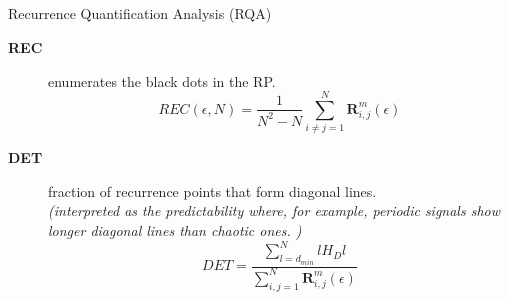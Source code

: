 \subsection{}
{

\begin{frame}{Recurrence Quantification Analysis (RQA)}

\begin{description}
\item [ \textbf{REC} ] enumerates the black dots in the RP.
\begin{equation*}
	REC(\epsilon,N)= 
	\frac{1}{N^2 - N} \sum^{N}_{i \neq j = 1} 
	\mathbf{R}^{m}_{i,j}(\epsilon)
\end{equation*}
\item [ \textbf{DET} ] fraction of recurrence points that form diagonal lines. \\
			\textit{(interpreted as the predictability where, for example,
				periodic signals show longer diagonal lines 
				than chaotic ones.
				)}
\begin{equation*}
	DET=\frac{\sum^{N}_{l=d_{min}} l H_D{l} }{\sum^{N}_{i,j=1} 
	\mathbf{R}^{m}_{i,j}(\epsilon) }
\end{equation*}

\end{description}


	
\end{frame}
}





